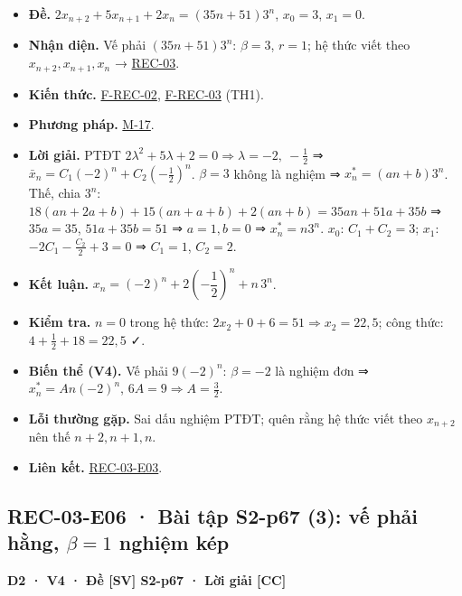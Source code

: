 \documentclass[
  10pt,
  twoside,openany]{book}
\providecommand{\tightlist}{%
  \setlength{\itemsep}{0pt}\setlength{\parskip}{0pt}}
\begin{document}
\begin{itemize}
\tightlist
\item
  \textbf{Đề.} \(2x_{n+2}+5x_{n+1}+2x_n=(35n+51)3^n\), \(x_0=3\),
  \(x_1=0\).
\item
  \textbf{Nhận diện.} Vế phải \((35n+51)3^n\): \(\beta=3\), \(r=1\); hệ
  thức viết theo \(x_{n+2},x_{n+1},x_n\) →
  \protect\hyperlink{REC-03}{REC-03}.
\item
  \textbf{Kiến thức.} \protect\hyperlink{F-REC-02}{F-REC-02},
  \protect\hyperlink{F-REC-03}{F-REC-03} (TH1).
\item
  \textbf{Phương pháp.} \protect\hyperlink{M-17}{M-17}.
\item
  \textbf{Lời giải.} PTĐT
  \(2\lambda^2+5\lambda+2=0\Rightarrow\lambda=-2,\ -\frac12\) ⇒
  \(\bar x_n=C_1(-2)^n+C_2\left(-\frac12\right)^n\). \(\beta=3\) không
  là nghiệm ⇒ \(x_n^*=(an+b)3^n\). Thế, chia \(3^n\):
  \(18(an+2a+b)+15(an+a+b)+2(an+b)=35an+51a+35b\) ⇒ \(35a=35\),
  \(51a+35b=51\) ⇒ \(a=1,b=0\) ⇒ \(x_n^*=n3^n\). \(x_0\): \(C_1+C_2=3\);
  \(x_1\): \(-2C_1-\frac{C_2}{2}+3=0\) ⇒ \(C_1=1\), \(C_2=2\).
\item
  \textbf{Kết luận.} \(x_n=(-2)^n+2\left(-\dfrac12\right)^n+n\,3^n\).
\item
  \textbf{Kiểm tra.} \(n=0\) trong hệ thức:
  \(2x_2+0+6=51\Rightarrow x_2=22{,}5\); công thức:
  \(4+\frac12+18=22{,}5\) ✓.
\item
  \textbf{Biến thể (V4).} Vế phải \(9(-2)^n\): \(\beta=-2\) là nghiệm
  đơn ⇒ \(x_n^*=An(-2)^n\), \(6A=9\Rightarrow A=\frac32\).
\item
  \textbf{Lỗi thường gặp.} Sai dấu nghiệm PTĐT; quên rằng hệ thức viết
  theo \(x_{n+2}\) nên thế \(n+2,n+1,n\).
\item
  \textbf{Liên kết.} \protect\hyperlink{REC-03-E03}{REC-03-E03}.
\end{itemize}

\hypertarget{REC-03-E06}{%
\subsection{\texorpdfstring{REC-03-E06 · Bài tập S2-p67 (3): vế phải
hằng, \(\beta=1\) nghiệm
kép}{REC-03-E06 · Bài tập S2-p67 (3): vế phải hằng, \textbackslash beta=1 nghiệm kép}}\label{REC-03-E06}}

\textbf{D2 · V4 · Đề {[}SV{]} S2-p67 · Lời giải {[}CC{]}}
\end{document}
